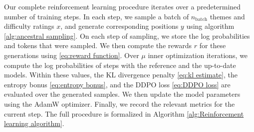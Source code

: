 Our complete reinforcement learning procedure iterates over a predetermined number of training steps. In each step, we sample a batch of $n_{\text{batch}}$ themes and difficulty ratings $x$, and generate corresponding positions $y$ using algorithm \ref{alg:ancestral sampling}. On each step of sampling, we store the log probabilities and tokens that were sampled. We then compute the rewards $r$ for these generations using \eqref{eq:reward function}. Over $\mu$ inner optimization iterations, we compute the log probabilities of steps with the reference and the up-to-date models. Within these values, the KL divergence penalty \eqref{eq:kl estimate}, the entropy bonus \eqref{eq:entropy bonus}, and the DDPO loss \eqref{eq:DDPO loss} are evaluated over the generated samples. We then update the model parameters using the AdamW optimizer. Finally, we record the relevant metrics for the current step. The full procedure is formalized in Algorithm \ref{alg:Reinforcement learning algorithm}.


\begin{algorithm}[h]
    \caption{Reinforcement learning algorithm}
    \label{alg:Reinforcement learning algorithm}
\end{algorithm}

